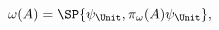 \begin{equation}
    \label{eq:omegaExp}
    \omega(A) = \SP{\psi_\Unit, \pi_\omega(A)\psi_\Unit},
\end{equation}

